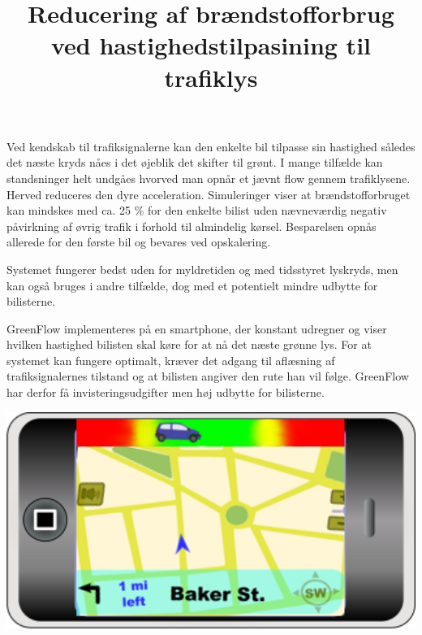 \documentclass{article}
\title{Reducering af brændstofforbrug ved hastighedstilpasining til trafiklys}
\date{}
\begin{document}
\maketitle

\noindent Ved kendskab til trafiksignalerne kan den enkelte bil tilpasse sin hastighed således det næste kryds nåes i det øjeblik det skifter til grønt.
I mange tilfælde kan standsninger helt undgåes hvorved man opnår et jævnt flow gennem trafiklysene.
Herved reduceres den dyre acceleration.
Simuleringer viser at brændstofforbruget kan mindskes med ca. 25 \% for den enkelte bilist uden nævneværdig negativ påvirkning af øvrig trafik i forhold til almindelig kørsel.
Besparelsen opnås allerede for den første bil og bevares ved opskalering.

\noindent Systemet fungerer bedst uden for myldretiden og med tidsstyret lyskryds, men kan også bruges i andre tilfælde, dog med et potentielt mindre udbytte for bilisterne.

\noindent GreenFlow implementeres på en smartphone, der konstant udregner og viser hvilken hastighed bilisten skal køre for at nå det næste grønne lys.
For at systemet kan fungere optimalt, kræver det adgang til aflæsning af trafiksignalernes tilstand og at bilisten angiver den rute han vil følge.
GreenFlow har derfor få invisteringsudgifter men høj udbytte for bilisterne.

\vspace{15mm}
\includegraphics[width=1\textwidth]{images/product.png}
\end{document}

